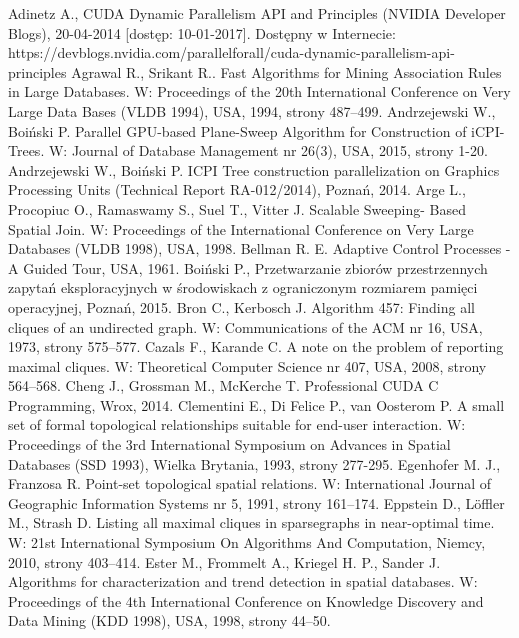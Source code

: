 \documentclass[12pt]{article}
\begin{document}
\begin{thebibliography}{}
Adinetz A., CUDA Dynamic Parallelism API and Principles (NVIDIA Developer Blogs), 20-04-2014 [dostęp: 10-01-2017]. Dostępny w Internecie: https://devblogs.nvidia.com/parallelforall/cuda-dynamic-parallelism-api-principles
Agrawal R., Srikant R.. Fast Algorithms for Mining Association Rules in Large Databases. W: Proceedings of the 20th International Conference on Very Large Data Bases (VLDB 1994), USA, 1994, strony 487–499.
Andrzejewski W., Boiński P. Parallel GPU-based Plane-Sweep Algorithm for Construction of iCPI-Trees. W: Journal of Database Management nr 26(3), USA, 2015, strony 1-20.
Andrzejewski W., Boiński P. ICPI Tree construction parallelization on Graphics Processing Units
(Technical Report RA-012/2014), Poznań, 2014.
Arge L., Procopiuc O., Ramaswamy S., Suel T., Vitter J. Scalable Sweeping- Based Spatial Join. W: Proceedings of the International Conference on Very Large Databases (VLDB 1998), USA, 1998.
Bellman R. E. Adaptive Control Processes - A Guided Tour, USA, 1961.
Boiński P., Przetwarzanie zbiorów przestrzennych zapytań eksploracyjnych w środowiskach z ograniczonym rozmiarem pamięci operacyjnej, Poznań, 2015.
Bron C., Kerbosch J. Algorithm 457: Finding all cliques of an undirected graph. W: Communications of the ACM nr 16, USA, 1973, strony 575–577.
Cazals F., Karande C. A note on the problem of reporting maximal cliques. W: Theoretical Computer Science nr 407, USA, 2008, strony 564–568.
Cheng J., Grossman M., McKerche T. Professional CUDA C Programming, Wrox, 2014.
Clementini E., Di Felice P., van Oosterom P. A small set of formal topological relationships suitable for end-user interaction. W: Proceedings of the 3rd International Symposium on Advances in Spatial Databases (SSD 1993), Wielka Brytania, 1993, strony 277-295.
Egenhofer M. J., Franzosa R. Point-set topological spatial relations. W: International Journal of Geographic Information Systems nr 5, 1991, strony 161–174.
Eppstein D., Löffler M., Strash D. Listing all maximal cliques in sparsegraphs in near-optimal time. W: 21st International Symposium On Algorithms And Computation, Niemcy, 2010, strony 403–414.
Ester M., Frommelt A., Kriegel H. P., Sander J. Algorithms for characterization and trend detection in spatial databases. W: Proceedings of the 4th International Conference on Knowledge Discovery and Data Mining (KDD 1998), USA, 1998, strony 44–50.

\end{thebibliography}
\end{document}
